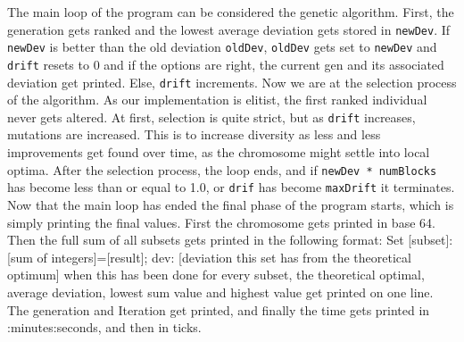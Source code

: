 \documentclass[a4paper,10pt]{article}
\begin{document}
The main loop of the program can be considered the genetic algorithm.
First, the generation gets ranked and the lowest average deviation gets stored in {\tt newDev}.
If {\tt newDev} is better than the old deviation {\tt oldDev}, {\tt oldDev} gets set to {\tt newDev} and {\tt drift} resets to 0 and if the options are right, the current gen and its associated deviation get printed.
Else, {\tt drift} increments.
Now we are at the selection process of the algorithm.
As our implementation is elitist, the first ranked individual never gets altered.
At first, selection is quite strict, but as {\tt drift} increases, mutations are increased.
This is to increase diversity as less and less improvements get found over time, as the chromosome might settle into local optima.
After the selection process, the loop ends, and if {\tt newDev * numBlocks} has become less than or equal to 1.0, or {\tt drif} has become {\tt maxDrift} it terminates.
\newline
\newline
Now that the main loop has ended the final phase of the program starts, which is simply printing the final values.
First the chromosome gets printed in base 64.
Then the full sum of all subsets gets printed in the following format:
Set [subset]: [sum of integers]=[result]; dev: [deviation this set has from the theoretical optimum]
when this has been done for every subset, the theoretical optimal, average deviation, lowest sum value and highest value get printed on one line.
The generation and Iteration get printed, and finally the time gets printed in :minutes:seconds, and then in ticks.
\newpage
\end{document}
